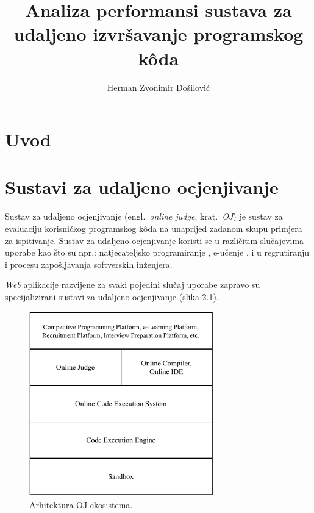 \documentclass[times, utf8, diplomski]{fer}
\begin{document}

\title{Analiza performansi sustava za udaljeno izvršavanje programskog kôda}

\author{Herman Zvonimir Došilović}

\maketitle



\zahvala{}

\tableofcontents

\chapter{Uvod}

\chapter{Sustavi za udaljeno ocjenjivanje}
Sustav za udaljeno ocjenjivanje (engl.\ \textit{online judge}, krat.\ \textit{OJ}) je sustav za evaluaciju korisničkog programskog kôda na unaprijed zadanom skupu primjera za ispitivanje. Sustav za udaljeno ocjenjivanje koristi se u različitim slučajevima uporabe  kao što su npr.: natjecateljsko programiranje , e-učenje , i u regrutiranju i procesu zapošljavanja  softverskih inženjera. \citep{9245310}

\textit{Web} aplikacije razvijene za svaki pojedini slučaj uporabe zapravo su specijalizirani sustavi za udaljeno ocjenjivanje (slika \ref{fig:oj-ecosystem}).

\begin{figure}[htb]
	\centering
	\includegraphics[width=8cm]{images/OJ_ecosystem.pdf}
	\caption{
		Arhitektura OJ ekosistema. \citep{9245310}
	}
	\label{fig:oj-ecosystem}
\end{figure}
\end{document}
